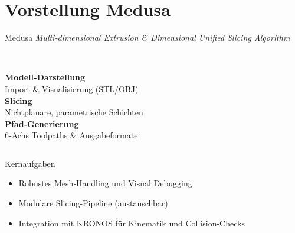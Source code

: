 \section{Vorstellung Medusa}

\begin{frame}{Medusa}
    \centering
    \textit{Multi‑dimensional Extrusion \& Dimensional Unified Slicing Algorithm}
    \vspace{0.4cm}

    \begin{columns}[T]
            \centering
            \faFileCode\\
            \textbf{Modell‑Darstellung}\\
            \small Import \& Visualisierung (STL/OBJ)
            \centering
            \faCogs\\
            \textbf{Slicing}\\
            \small Nichtplanare, parametrische Schichten
            \centering
            \faRobot\\
            \textbf{Pfad‑Generierung}\\
            \small 6‑Achs Toolpaths \& Ausgabeformate
    \end{columns}

    \vspace{0.35cm}
    \begin{block}{Kernaufgaben}
        \small
        \begin{itemize}
            \item Robustes Mesh‑Handling und Visual Debugging
            \item Modulare Slicing‑Pipeline (austauschbar)
            \item Integration mit KRONOS für Kinematik und Collision‑Checks
        \end{itemize}
    \end{block}
\end{frame}

